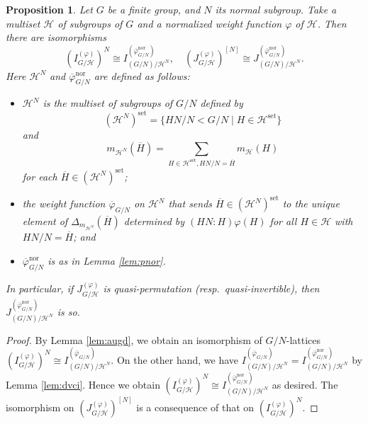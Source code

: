 \documentclass[12pt]{amsart}
\theoremstyle{plain}
\newtheorem{prop}[thm]{Proposition}
\theoremstyle{definition}
\numberwithin{thm}{section}
\numberwithin{equation}{section}
\newcommand{\cH}{\mathcal{H}}
\DeclareMathOperator{\nor}{nor}
\DeclareMathOperator{\set}{set}
\begin{document}
\begin{prop}\label{prop:tkfx}
Let $G$ be a finite group, and $N$ its normal subgroup. Take a multiset $\cH$ of subgroups of $G$ and a normalized weight function $\varphi$ of $\cH$. Then there are isomorphisms
\begin{equation*}
(I_{G/\cH}^{(\varphi)})^{N}\cong I_{(G/N)/\cH^{N}}^{(\overline{\varphi}_{G/N}^{\nor})}, \quad 
(J_{G/\cH}^{(\varphi)})^{[N]}\cong J_{(G/N)/\cH^{N}}^{(\overline{\varphi}_{G/N}^{\nor})}. 
\end{equation*}
Here $\cH^{N}$ and $\overline{\varphi}_{G/N}^{\nor}$ are defined as follows: 
\begin{itemize}
\item $\cH^{N}$ is the multiset of subgroups of $G/N$ defined by
\begin{equation*}
    (\cH^{N})^{\set}=\{HN/N<G/N\mid H\in \cH^{\set}\}
\end{equation*}
and
\begin{equation*}
    m_{\cH^{N}}(\overline{H})=\sum_{H\in \cH^{\set},HN/N=\overline{H}}m_{\cH}(H)
\end{equation*}
for each $\overline{H}\in (\cH^{N})^{\set}$; 
\item the weight function $\overline{\varphi}_{G/N}$ on $\cH^{N}$ that sends $\overline{H}\in (\cH^{N})^{\set}$ to the unique element of $\Delta_{m_{\cH^{N}}}(\overline{H})$ determined by $(HN:H)\varphi(H)$ for all $H\in \cH$ with $HN/N=\overline{H}$; and
\item $\overline{\varphi}_{G/N}^{\nor}$ is as in Lemma \ref{lem:pnor}. 
\end{itemize}
In particular, if $J_{G/\cH}^{(\varphi)}$ is quasi-permutation (resp.~quasi-invertible), then $J_{(G/N)/\cH^{N}}^{(\overline{\varphi}_{G/N}^{\nor})}$ is so.  
\end{prop}

\begin{proof}
By Lemma \ref{lem:augd}, we obtain an isomorphism of $G/N$-lattices $(I_{G/\cH}^{(\varphi)})^{N}\cong I_{(G/N)/\cH^{N}}^{(\overline{\varphi}_{G/N})}$. On the other hand, we have $I_{(G/N)/\cH^{N}}^{(\overline{\varphi}_{G/N})}=I_{(G/N)/\cH^{N}}^{(\overline{\varphi}_{G/N}^{\nor})}$ by Lemma \ref{lem:dvci}. Hence we obtain $(I_{G/\cH}^{(\varphi)})^{N}\cong I_{(G/N)/\cH^{N}}^{(\overline{\varphi}_{G/N}^{\nor})}$ as desired. The isomorphism on $(J_{G/\cH}^{(\varphi)})^{[N]}$ is a consequence of that on $(I_{G/\cH}^{(\varphi)})^{N}$. 
\end{proof}
\end{document}
